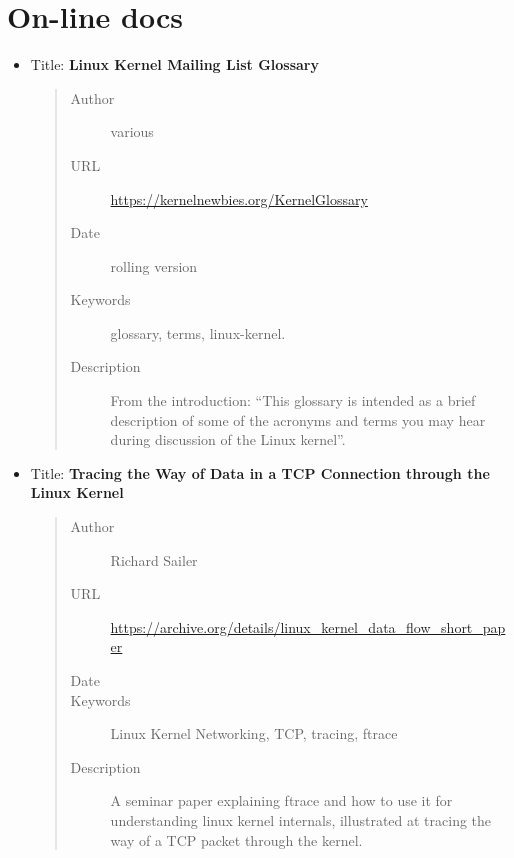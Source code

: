 \documentclass[a4paper,8pt,english]{sphinxmanual}
\begin{document}
\section{On-line docs}
\label{process/kernel-docs:on-line-docs}\begin{itemize}
\item {} 
Title: \textbf{Linux Kernel Mailing List Glossary}
\begin{quote}\begin{description}
\item[{Author}] \leavevmode
various

\item[{URL}] \leavevmode
\href{https://kernelnewbies.org/KernelGlossary}{https://kernelnewbies.org/KernelGlossary}

\item[{Date}] \leavevmode
rolling version

\item[{Keywords}] \leavevmode
glossary, terms, linux-kernel.

\item[{Description}] \leavevmode
From the introduction: ``This glossary is intended as
a brief description of some of the acronyms and terms you may hear
during discussion of the Linux kernel''.

\end{description}\end{quote}

\item {} 
Title: \textbf{Tracing the Way of Data in a TCP Connection through the Linux Kernel}
\begin{quote}\begin{description}
\item[{Author}] \leavevmode
Richard Sailer

\item[{URL}] \leavevmode
\href{https://archive.org/details/linux\_kernel\_data\_flow\_short\_paper}{https://archive.org/details/linux\_kernel\_data\_flow\_short\_paper}

\item[{Date}] 

\item[{Keywords}] \leavevmode
Linux Kernel Networking, TCP, tracing, ftrace

\item[{Description}] \leavevmode
A seminar paper explaining ftrace and how to use it for
understanding linux kernel internals,
illustrated at tracing the way of a TCP packet through the kernel.


\end{description}
\end{quote}
\end{itemize}
\end{document}
